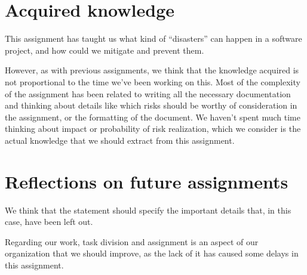 \documentclass{article}
\begin{document}
\section{Acquired knowledge}

This assignment has taught us what kind of ``disasters'' can happen in a software project, and how could we mitigate and prevent them.

However, as with previous assignments, we think that the knowledge acquired is not proportional to the time we've been working on this. Most of the complexity of the assignment has been related to writing all the necessary documentation and thinking about details like which risks should be worthy of consideration in the assignment, or the formatting of the document. We haven't spent much time thinking about impact or probability of risk realization, which we consider is the actual knowledge that we should extract from this assignment.

\section{Reflections on future assignments}

We think that the statement should specify the important details that, in this case, have been left out.

Regarding our work, task division and assignment is an aspect of our organization that we should improve, as the lack of it has caused some delays in this assignment.
\end{document}
